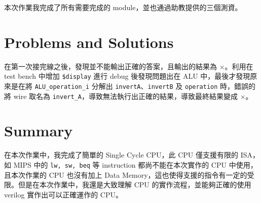 \documentclass[twocolumn]{extarticle}
\begin{document}
本次作業我完成了所有需要完成的 module，並也通過助教提供的三個測資。

\section{Problems and Solutions}

在第一次接完線之後，發現並不能輸出正確的答案，且輸出的結果為 $\times$。利用在 test bench 中增加 \texttt{\$display} 進行 debug 後發現問題出在 ALU 中，最後才發現原來是在將 \texttt{ALU\_operation\_i} 分解出 \texttt{invertA}、\texttt{invertB} 及 \texttt{operation} 時，錯誤的將 wire 取名為 \texttt{invert\_A}，導致無法執行出正確的結果，導致最終結果變成 $\times$。

\section{Summary}

在本次作業中，我完成了簡單的 Single Cycle CPU，此 CPU 僅支援有限的 ISA，如 MIPS 中的 \texttt{lw, sw, beq} 等 instruction 都尚不能在本次實作的 CPU 中使用，且本次作業的 CPU 也沒有加上 Data Memory，這也使得支援的指令有一定的受限。但是在本次作業中，我還是大致理解 CPU 的實作流程，並能夠正確的使用 verilog 實作出可以正確運作的 CPU。
\end{document}
